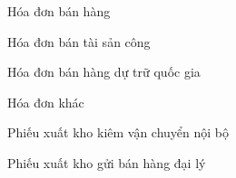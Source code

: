 Hóa đơn bán hàng



















Hóa đơn bán tài sản công



















Hóa đơn bán hàng dự trữ quốc gia



















Hóa đơn khác



















Phiếu xuất kho kiêm vận chuyển nội bộ



















Phiếu xuất kho gửi bán hàng đại lý



















